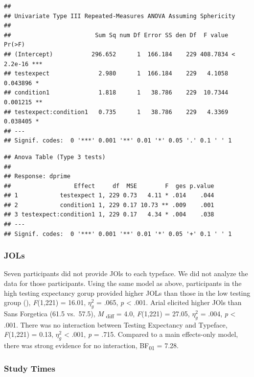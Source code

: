 \documentclass[
  english,
  man]{apa6}
\begin{document}
\begin{verbatim}
## 
## Univariate Type III Repeated-Measures ANOVA Assuming Sphericity
## 
##                        Sum Sq num Df Error SS den Df  F value    Pr(>F)    
## (Intercept)           296.652      1  166.184    229 408.7834 < 2.2e-16 ***
## testexpect              2.980      1  166.184    229   4.1058  0.043896 *  
## condition1              1.818      1   38.786    229  10.7344  0.001215 ** 
## testexpect:condition1   0.735      1   38.786    229   4.3369  0.038405 *  
## ---
## Signif. codes:  0 '***' 0.001 '**' 0.01 '*' 0.05 '.' 0.1 ' ' 1
\end{verbatim}

\begin{verbatim}
## Anova Table (Type 3 tests)
## 
## Response: dprime
##                  Effect     df  MSE        F  ges p.value
## 1            testexpect 1, 229 0.73   4.11 * .014    .044
## 2            condition1 1, 229 0.17 10.73 ** .009    .001
## 3 testexpect:condition1 1, 229 0.17   4.34 * .004    .038
## ---
## Signif. codes:  0 '***' 0.001 '**' 0.01 '*' 0.05 '+' 0.1 ' ' 1
\end{verbatim}

\hypertarget{jols}{%
\subsubsection{JOLs}\label{jols}}

Seven participants did not provide JOls to each typeface. We did not analyze the data for those participants. Using the same model as above, participants in the high testing expectancy gorup provided higher JOLs than those in the low testing group (), \emph{F}(1,221) = 16.01, \(\eta_{g}^{2}\) = .065, \emph{p} \textless{} .001. Arial elicited higher JOls than Sans Forgetica (61.5 vs.~57.5), \emph{M} \textsubscript{diff} = 4.0, \emph{F}(1,221) = 27.05, \(\eta_{g}^{2}\) = .004, \emph{p} \textless{} .001. There was no interaction between Testing Expectancy and Typeface, \emph{F}(1,221) = 0.13, \(\eta_{g}^{2}\) \textless{} .001, \emph{p} = .715. Compared to a main effects-only model, there was strong evidence for no interaction, BF\textsubscript{01} = 7.28.

\hypertarget{study-times}{%
\subsubsection{Study Times}\label{study-times}}
\end{document}
